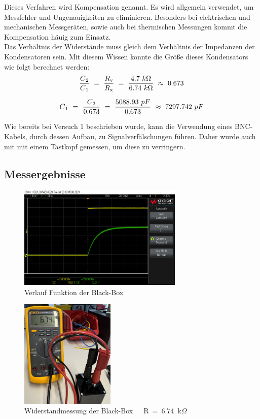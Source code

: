\documentclass[a4paper,12pt]{article}
\begin{document}
\noindent Dieses Verfahren wird Kompensation genannt. Es wird allgemein verwendet, um Messfehler und Ungenauigkeiten zu eliminieren. Besonders bei elektrischen und mechanischen Messgeräten, sowie auch bei thermischen Messungen kommt die Kompensation häuig zum Einsatz.\\


\noindent Das Verhältnis der Widerstände muss gleich dem Verhältnis der Impedanzen der Kondensatoren sein. Mit diesem Wissen konnte die Größe dieses Kondensators wie folgt berechnet werden:
\[
\frac{C\textsubscript{2}}{C\textsubscript{1}}~=~\frac{R\textsubscript{v}}{R\textsubscript{x}}~=~\frac{4.7~k\Omega}{6.74~k\Omega}~\approx~0.673\]

\[
C\textsubscript{1}~=~\frac{C\textsubscript{2}}{0.673}~=~\frac{5088.93~pF}{0.673}~\approx~7297.742~pF
\]



\noindent Wie bereits bei Versuch 1 beschrieben wurde, kann die Verwendung eines BNC-Kabels, durch dessen Aufbau, zu Signalverfälschungen führen. Daher wurde auch mit mit einem Tastkopf gemessen, um diese zu verringern.


\subsection{Messergebnisse}
\begin{figure}[H]
    \centering
    \includegraphics[width=0.7\textwidth]{../Quellen/Labor2/scope_3.png}
\caption{Verlauf Funktion der Black-Box}
\end{figure}



\begin{figure}[H]
    \centering
    \includegraphics[width=0.4\textwidth]{../Quellen/Labor2/Fotos/IMG_3973gezoomt.jpeg}
\caption{Widerstandmessung der Black-Box~~~R~=~6.74~k$\Omega$}
\end{figure}
\end{document}

